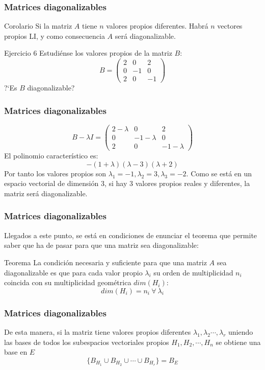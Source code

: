 \documentclass{beamer}
\begin{document}
\begin{frame}
\frametitle{Matrices diagonalizables}
\begin{block}{Corolario}
Si la matriz $A$ tiene $n$ valores propios diferentes. Habr\'a $n$ vectores propios LI, y como consecuencia $A$ ser\'a diagonalizable.
\end{block}

\begin{block}{Ejercicio 6}
Estudi\'ense los valores propios de la matriz $B$:
\[B=\left(\begin{array}{ccc}2 & 0 & 2 \\0 & -1 & 0 \\2 & 0 & -1\end{array}\right)\]
?`Es $B$ diagonalizable?
\end{block}
\end{frame}

\begin{frame}
\frametitle{Matrices diagonalizables}

\[B- \lambda I=\left(\begin{array}{ccc}2- \lambda & 0 & 2 \\0 & -1- \lambda & 0 \\2 & 0 & -1- \lambda\end{array}\right)\]
El polinomio caracter\'istico es:
\[-(1+\lambda)(\lambda-3)(\lambda+2)\]
Por tanto los valores propios son $\lambda_1 = -1, \lambda_2 = 3, \lambda_3 = -2$. Como se est\'a en un espacio vectorial de dimensi\'on 3, si hay 3 valores propios reales y diferentes, la matriz ser\'a diagonalizable.
\end{frame}

\begin{frame}
\frametitle{Matrices diagonalizables}
Llegados a este punto, se est\'a en condiciones de enunciar el teorema que permite saber que ha de pasar para que una matriz sea diagonalizable:
\begin{block}{Teorema}
La condici\'on necesaria y suficiente para que una matriz $A$ sea diagonalizable es que para cada valor propio $\lambda_i$ su orden de multiplicidad $n_i$ coincida con su multiplicidad geom\'etrica $dim(H_i)$:
\[dim(H_i) = n_i\ \forall \ \lambda_i\]

\end{block}
\end{frame}


\begin{frame}
\frametitle{Matrices diagonalizables}

De esta manera, si la matriz tiene valores propios diferentes $\lambda_1, \lambda_2\cdots, \lambda_r$ uniendo las bases de todos los subespacios vectoriales propios $H_1,H_2,\cdots, H_n$ se obtiene una base en $E$
\[\{B_{H_1}\cup B_{H_2} \cup \cdots \cup B_{H_r}\} = B_E\]
\end{frame}
\end{document}
